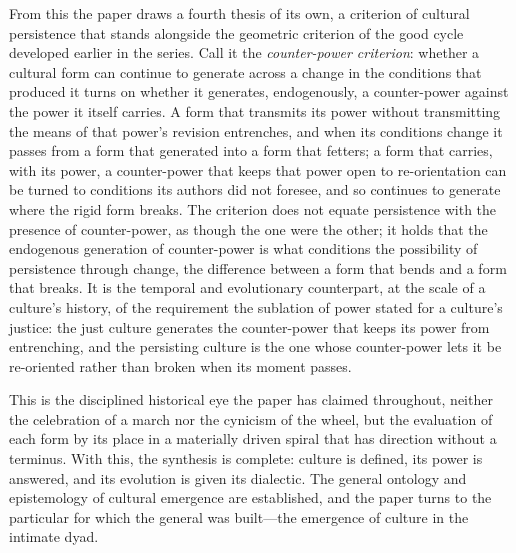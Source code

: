 From this the paper draws a fourth thesis of its own, a criterion of cultural persistence that stands alongside the geometric criterion of the good cycle developed earlier in the series. Call it the \emph{counter-power criterion}: whether a cultural form can continue to generate across a change in the conditions that produced it turns on whether it generates, endogenously, a counter-power against the power it itself carries. A form that transmits its power without transmitting the means of that power's revision entrenches, and when its conditions change it passes from a form that generated into a form that fetters; a form that carries, with its power, a counter-power that keeps that power open to re-orientation can be turned to conditions its authors did not foresee, and so continues to generate where the rigid form breaks. The criterion does not equate persistence with the presence of counter-power, as though the one were the other; it holds that the endogenous generation of counter-power is what conditions the possibility of persistence through change, the difference between a form that bends and a form that breaks. It is the temporal and evolutionary counterpart, at the scale of a culture's history, of the requirement the sublation of power stated for a culture's justice: the just culture generates the counter-power that keeps its power from entrenching, and the persisting culture is the one whose counter-power lets it be re-oriented rather than broken when its moment passes.

This is the disciplined historical eye the paper has claimed throughout, neither the celebration of a march nor the cynicism of the wheel, but the evaluation of each form by its place in a materially driven spiral that has direction without a terminus. With this, the synthesis is complete: culture is defined, its power is answered, and its evolution is given its dialectic. The general ontology and epistemology of cultural emergence are established, and the paper turns to the particular for which the general was built---the emergence of culture in the intimate dyad.
